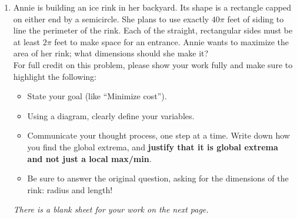 \documentclass{article}
\begin{document}
\begin{enumerate}
\begin{enumerate}
\begin{multicols}{2}
\begin{enumerate}
        \end{enumerate}
        \end{multicols}
         \item \begin{problem}[\vfill]Considering your chosen formula and what is known about the scenario: When, if ever, will the concentration of hydrogen peroxide reach 10 pph? Include units. Give an exact answer or explain why the concentration will never reach 10 pph. 
        \end{problem}
        \item \begin{problem}[\vfill] Considering your chosen formula and what is known about the scenario: When, if ever, will the concentration of hydrogen peroxide reach 0 pph? Include units. Give an exact answer or explain why the concentration will never reach 0 pph.
        \end{problem}
\newpage
        \item \begin{problem}
        Is $C$ invertible? In 1 sentence, explain how you know.
        \end{problem}
        \vspace{1.5in}
        \item If you answered that $C$ was invertible, explain in 1 sentence what $C^{-1}$ represents. If you answered that $C$ was not invertible, give the restricted domain on which $C$ is invertible.
        \vspace{1.5in}
    \end{enumerate}
   \item Annie is building an ice rink in her backyard. Its shape is a rectangle capped on either end by a semicircle. She plans to use exactly $40\pi$ feet of siding to line the perimeter of the rink. Each of the straight, rectangular sides must be at least $2\pi$ feet to make space for an entrance. Annie wants to maximize the area of her rink; what dimensions should she make it?\\

 For full credit on this problem, please show your work fully and make sure to highlight the following:

  \begin{itemize}[nosep]
  \item State your goal (like ``Minimize cost'').
  \item Using a diagram, clearly define your variables.
  \item Communicate your thought process, one step at a time. Write down how you find the global extrema, and \textbf{justify that it is global extrema and not just a local max/min}. 
  \item Be sure to answer the original question, asking for the dimensions of the rink: radius and length!
  \end{itemize}
  \emph{There is a blank sheet for your work on the next page.}



\end{enumerate}
\end{document}
